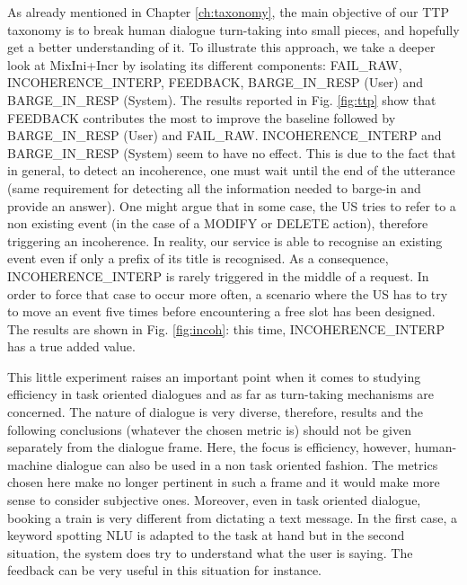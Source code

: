     	As already mentioned in Chapter \ref{ch:taxonomy}, the main objective of our TTP taxonomy is to break human dialogue turn-taking into small pieces, and hopefully get a better understanding of it. To illustrate this approach, we take a deeper look at MixIni+Incr by isolating its different components: FAIL\_RAW, INCOHERENCE\_INTERP, FEEDBACK, BARGE\_IN\_RESP (User) and BARGE\_IN\_RESP (System). The results reported in Fig. \ref{fig:ttp} show that FEEDBACK contributes the most to improve the baseline followed by BARGE\_IN\_RESP (User) and FAIL\_RAW. INCOHERENCE\_INTERP and BARGE\_IN\_RESP (System) seem to have no effect. This is due to the fact that in general, to detect an incoherence, one must wait until the end of the utterance (same requirement for detecting all the information needed to barge-in and provide an answer). One might argue that in some case, the US tries to refer to a non existing event (in the case of a MODIFY or DELETE action), therefore triggering an incoherence. In reality, our service is able to recognise an existing event even if only a prefix of its title is recognised. As a consequence, INCOHERENCE\_INTERP is rarely triggered in the middle of a request. In order to force that case to occur more often, a scenario where the US has to try to move an event five times before encountering a free slot has been designed. The results are shown in Fig. \ref{fig:incoh}: this time, INCOHERENCE\_INTERP has a true added value.
        
        This little experiment raises an important point when it comes to studying efficiency in task oriented dialogues and as far as turn-taking mechanisms are concerned. The nature of dialogue is very diverse, therefore, results and the following conclusions (whatever the chosen metric is) should not be given separately from the dialogue frame. Here, the focus is efficiency, however, human-machine dialogue can also be used in a non task oriented fashion. The metrics chosen here make no longer pertinent in such a frame and it would make more sense to consider subjective ones. Moreover, even in task oriented dialogue, booking a train is very different from dictating a text message. In the first case, a keyword spotting NLU is adapted to the task at hand but in the second situation, the system does try to understand what the user is saying. The feedback can be very useful in this situation for instance.
        

